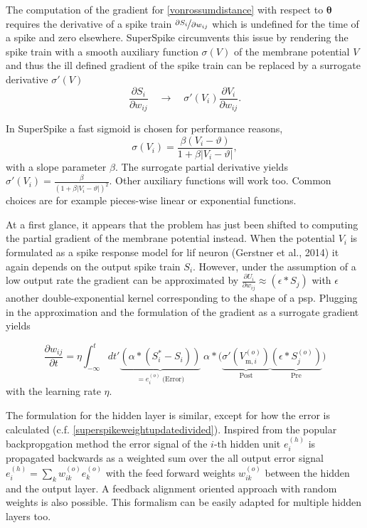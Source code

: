The computation of the gradient for \ref{vonrossumdistance} with respect to $\mathbf{\theta}$ requires the derivative of a spike train  $\nicefrac{\partial{S_i}}{\partial{w_{ij}}}$ which is undefined for the time of a spike and zero elsewhere. SuperSpike circumvents this issue by rendering the spike train with a smooth auxiliary function $\sigma(V)$ of the membrane potential $V$ and thus the ill defined gradient of the spike train can be replaced by a surrogate derivative $\sigma'(V)$
\begin{equation*}
\frac{\partial S_i}{\partial w_{ij}} \quad \rightarrow \quad \sigma'(V_i)\frac{\partial V_i}{\partial w_{ij}}.
\end{equation*}

In SuperSpike a fast sigmoid is chosen for performance reasons, 
\begin{equation}
\sigma(V_i) = \frac{\beta (V_i - \vartheta)}{1 + \beta |V_i - \vartheta|},
\label{auxilliaryfunction}
\end{equation}
with a slope parameter $\beta$. The surrogate partial derivative yields $\sigma'(V_i) = \frac{\beta}{(1 + \beta |V_i - \vartheta|)^2}$. Other auxiliary functions will work too. Common choices are for example pieces-wise linear or exponential functions.

At a first glance, it appears that the problem has just been shifted to computing the partial gradient of the membrane potential instead. When the potential $V_i$ is formulated as a spike response model for \gls{lif} neuron (Gerstner et al., 2014) it again depends on the output spike train $S_i$. However, under the assumption of a low output rate the gradient can be approximated by $\frac{\partial U_i}{\partial w_{ij}} \approx (\epsilon \ast S_j)$ with $\epsilon$ another double-exponential kernel corresponding to the shape of a \gls{psp}. Plugging in the approximation and the formulation of the gradient as a surrogate gradient yields

\begin{equation}
\frac{\partial w_{ij}}{\partial t} = \eta \int_{-\infty}^{t} dt'
\underbrace{\left(\alpha \ast (S^*_i - S_i)\right)}_{= e^{(o)}_i \; \text{(Error)}} 
\; \alpha \ast 
\Big(\underbrace{\sigma'(V^{(o)}_{\text{m},i})}_{\text{Post}} 
\underbrace{\left(\epsilon \ast S^{(o)}_j\right)}_{\text{Pre}}\Big)
\label{superspikeweightupdateeq}
\end{equation}
with the learning rate $\eta$. 

The formulation for the hidden layer is similar, except for how the error is calculated (c.f. \cref{superspikeweightupdatedivided}). Inspired from the popular backpropgation method the error signal of the $i \text{-th}$ hidden unit $e^{(h)}_i$ is propagated backwards as a weighted sum over the all output error signal $e^{(h)}_i = \sum_{k} w_{ik}^{(o)} e^{(o)}_k$ with the feed forward weights $w_{ik}^{(o)}$ between the hidden and the output layer. A feedback alignment oriented approach with random weights is also possible. This formalism can be easily adapted for multiple hidden layers too.

